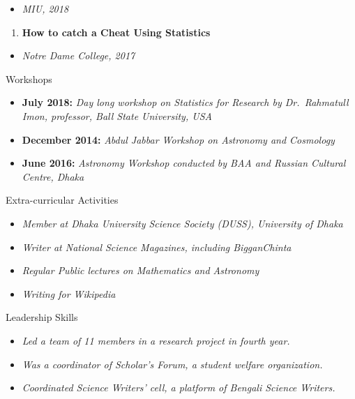 \documentclass[
]{book}
\providecommand{\tightlist}{%
  \setlength{\itemsep}{0pt}\setlength{\parskip}{0pt}}
\begin{document}
\begin{itemize}
\tightlist
\item
  \emph{MIU, 2018}
\end{itemize}

\begin{enumerate}
\def\labelenumi{\arabic{enumi}.}
\setcounter{enumi}{1}
\tightlist
\item
  \textbf{How to catch a Cheat Using Statistics}
\end{enumerate}

\begin{itemize}
\tightlist
\item
  \emph{Notre Dame College, 2017}
\end{itemize}

Workshops

\begin{itemize}
\tightlist
\item
  \textbf{July 2018:} \emph{Day long workshop on Statistics for Research by Dr.~Rahmatull Imon, professor, Ball State University, USA}
\item
  \textbf{December 2014:} \emph{Abdul Jabbar Workshop on Astronomy and Cosmology}
\item
  \textbf{June 2016:} \emph{Astronomy Workshop conducted by BAA and Russian Cultural
  Centre, Dhaka}
\end{itemize}

Extra-curricular Activities

\begin{itemize}
\tightlist
\item
  \emph{Member at Dhaka University Science Society (DUSS), University of Dhaka}
\item
  \emph{Writer at National Science Magazines, including BigganChinta}
\item
  \emph{Regular Public lectures on Mathematics and Astronomy}
\item
  \emph{Writing for Wikipedia}
\end{itemize}

Leadership Skills

\begin{itemize}
\tightlist
\item
  \emph{Led a team of 11 members in a research project in fourth year.}
\item
  \emph{Was a coordinator of Scholar's Forum, a student welfare organization.}
\item
  \emph{Coordinated Science Writers' cell, a platform of Bengali Science Writers.}
\end{itemize}
\end{document}
